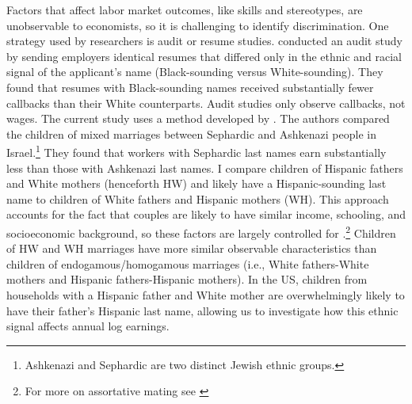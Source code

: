 Factors that affect labor market outcomes, like skills and stereotypes, are unobservable to economists, so it is challenging to identify discrimination. One strategy used by researchers is audit or resume studies. \textcite{bertrand2004emily} conducted an audit study by sending employers identical resumes that differed only in the ethnic and racial signal of the applicant’s name (Black-sounding versus White-sounding). They found that resumes with Black-sounding names received substantially fewer callbacks than their White counterparts. Audit studies only observe callbacks, not wages. The  current study uses a method developed by \textcite{rubinstein2014pride}. The authors compared the children of mixed marriages between Sephardic and Ashkenazi people in Israel.\footnote{Ashkenazi and Sephardic are two distinct Jewish ethnic groups.} They found that workers with Sephardic last names earn substantially less than those with Ashkenazi last names. I compare children of Hispanic fathers and White mothers (henceforth HW) and likely have a Hispanic-sounding last name to children of White fathers and Hispanic mothers (WH). This approach accounts for the fact that  couples are likely to have similar income, schooling, and socioeconomic background, so these factors are largely controlled for \autocite{averettBetterWorseRelationship2008, averettEconomicRealityBeauty1996}.\footnote{For more on assortative mating see \autocite{beckerTheoryMarriagePart1973, beckerTheoryMarriagePart1974, beckerTreatiseFamily1993, browningCollectiveUnitaryModels2006, chiapporiFatterAttractionAnthropometric2012}} Children of HW and WH marriages have more similar observable characteristics than children of endogamous/homogamous marriages (i.e., White fathers-White mothers and Hispanic fathers-Hispanic mothers). In the US, children  from households with a Hispanic father and White mother  are overwhelmingly likely to  have their father’s Hispanic last name, allowing us to investigate how this ethnic signal affects annual log earnings.

